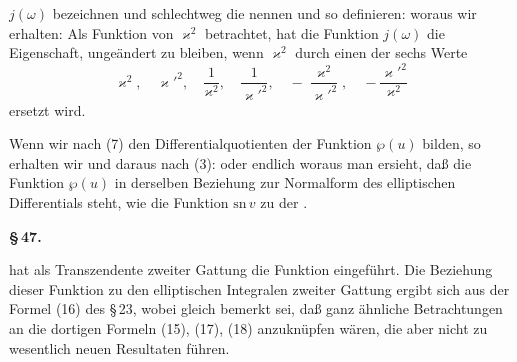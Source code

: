 $j(\omega)$ bezeichnen und schlechtweg die  nennen und so definieren:
woraus wir erhalten:
Als Funktion von $\varkappa^2$ betrachtet, hat die Funktion $j(\omega)$ die Eigenschaft,
ungeändert zu bleiben, wenn $\varkappa^2$ durch einen der sechs Werte
\[ \varkappa^2, \quad \varkappa'^2, \quad \frac{1}{\varkappa^2}, \quad \frac{1}{\varkappa'^2}, \quad -\frac{\varkappa^2}{\varkappa'^2}, \quad -\frac{\varkappa'^2}{\varkappa^2} \]
ersetzt wird.

Wenn wir nach (7) den Differentialquotienten der Funktion $\wp(u)$ bilden, so erhalten wir
und daraus nach (3):
oder endlich
woraus man ersieht, daß die Funktion $\wp(u)$ in derselben Beziehung zur
 Normalform des elliptischen Differentials steht, wie die
Funktion $\mathrm{sn}\,v$ zu der .

\begin{center}
\textbf{§\,47. }
\end{center}

 hat als Transzendente zweiter Gattung die Funktion
eingeführt. Die Beziehung dieser Funktion zu den elliptischen Integralen zweiter Gattung
ergibt sich aus der Formel (16) des §\,23, wobei gleich bemerkt sei, daß ganz ähnliche
Betrachtungen an die dortigen Formeln (15), (17), (18) anzuknüpfen wären, die aber nicht
zu wesentlich neuen Resultaten führen.
